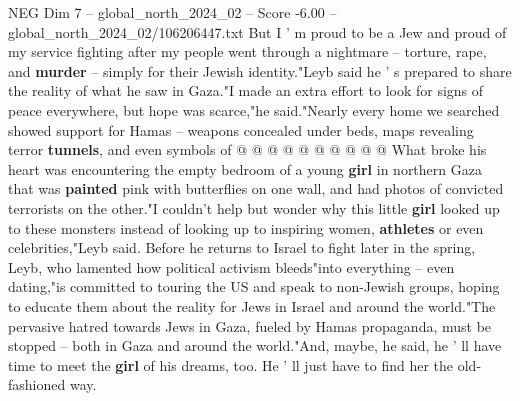 \begin{textsample}{NEG Dim 7 – global\_north\_2024\_02 – Score -6.00 – global\_north\_2024\_02/106206447.txt}
But I ' m proud to be a Jew and proud of my service fighting after my people went through a nightmare -- torture, rape, and \textbf{murder} -- simply for their Jewish identity."Leyb said he ' s prepared to share the reality of what he saw in Gaza."I made an extra effort to look for signs of peace everywhere, but hope was scarce,"he said."Nearly every home we searched showed support for Hamas -- weapons concealed under beds, maps revealing terror \textbf{tunnels}, and even symbols of @ @ @ @ @ @ @ @ @ @ What broke his heart was encountering the empty bedroom of a young \textbf{girl} in northern Gaza that was \textbf{painted} pink with butterflies on one wall, and had photos of convicted terrorists on the other."I couldn't help but wonder why this little \textbf{girl} looked up to these monsters instead of looking up to inspiring women, \textbf{athletes} or even celebrities,"Leyb said.
Before he returns to Israel to fight later in the spring, Leyb, who lamented how political activism bleeds"into everything -- even dating,"is committed to touring the US and speak to non-Jewish groups, hoping to educate them about the reality for Jews in Israel and around the world."The pervasive hatred towards Jews in Gaza, fueled by Hamas propaganda, must be stopped -- both in Gaza and around the world."And, maybe, he said, he ' ll have time to meet the \textbf{girl} of his dreams, too.
He ' ll just have to find her the old-fashioned way.

\end{textsample}
